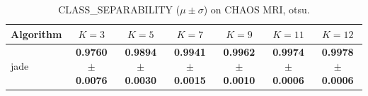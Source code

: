 \begin{table}[htbp]
\centering
\caption{CLASS_SEPARABILITY ($\mu \pm \sigma$) on CHAOS MRI, otsu.}
\label{tab:exp2-otsu-class_separability}
\begin{tabular}{lcccccc}
\toprule
Algorithm & $K=3$ & $K=5$ & $K=7$ & $K=9$ & $K=11$ & $K=12$ \\
\midrule
jade & \textbf{0.9760 $\pm$ 0.0076} & \textbf{0.9894 $\pm$ 0.0030} & \textbf{0.9941 $\pm$ 0.0015} & \textbf{0.9962 $\pm$ 0.0010} & \textbf{0.9974 $\pm$ 0.0006} & \textbf{0.9978 $\pm$ 0.0006} \\
\bottomrule
\end{tabular}
\end{table}